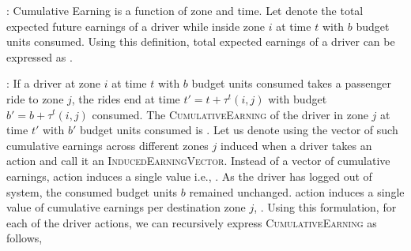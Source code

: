 \iffalse
{}:
Cumulative Earning is a function of zone and time. Let {} denote the total expected future earnings of a driver
while inside zone $i$ at time $t$ with $b$ budget units consumed. Using this definition, total expected earnings of a driver can be expressed
as {}.

:
If a driver at zone $i$ at time $t$ with $b$ budget units consumed takes a passenger ride to zone $j$, the rides end at time 
$t' = t + \tau^t(i,j)$ with budget $b' = b + \tau^t(i,j)$ consumed. The \textsc{CumulativeEarning} of the driver in zone $j$ at time $t'$ with $b'$
budget units consumed is {}. Let us denote using {} the vector of such
cumulative earnings across different zones $j$ induced when a driver takes an action {\getpassengeraction} and call it an 
\textsc{InducedEarningVector}. Instead of a vector of cumulative earnings, {\gohome} action induces a single value i.e., {}. 
As the driver has logged out of system, the consumed budget units $b$ remained unchanged. {\relocate} action induces a single value of cumulative earnings per destination zone $j$, {}. 
Using this formulation, for each of the driver actions, we can recursively express \textsc{CumulativeEarning} as follows,

